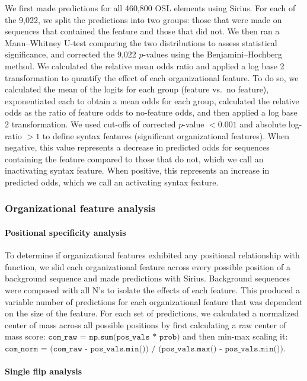 We first made predictions for all 460{,}800 OSL elements using Sirius. For each of the 9{,}022, we split the predictions into two groups: those that were made on sequences that contained the feature and those that did not. We then ran a Mann--Whitney U-test comparing the two distributions to assess statistical significance, and corrected the 9{,}022 $p$-values using the Benjamini--Hochberg method. We calculated the relative mean odds ratio and applied a log base 2 transformation to quantify the effect of each organizational feature. To do so, we calculated the mean of the logits for each group (feature vs.\ no feature), exponentiated each to obtain a mean odds for each group, calculated the relative odds as the ratio of feature odds to no-feature odds, and then applied a log base 2 transformation. We used cut-offs of corrected $p$-value $< 0.001$ and absolute log-ratio $> 1$ to define syntax features (significant organizational features). When negative, this value represents a decrease in predicted odds for sequences containing the feature compared to those that do not, which we call an inactivating syntax feature. When positive, this represents an increase in predicted odds, which we call an activating syntax feature.

\subsubsection{Organizational feature analysis}

\paragraph{Positional specificity analysis}

To determine if organizational features exhibited any positional relationship with function, we slid each organizational feature across every possible position of a background sequence and made predictions with Sirius. Background sequences were composed with all N’s to isolate the effects of each feature. This produced a variable number of predictions for each organizational feature that was dependent on the size of the feature. For each set of predictions, we calculated a normalized center of mass across all possible positions by first calculating a raw center of mass score: \(\texttt{com\_raw = np.sum(pos\_vals * prob)}\) and then min-max scaling it: \(\texttt{com\_norm = (com\_raw - pos\_vals.min()) / (pos\_vals.max() - pos\_vals.min())}\).

\paragraph{Single flip analysis}

